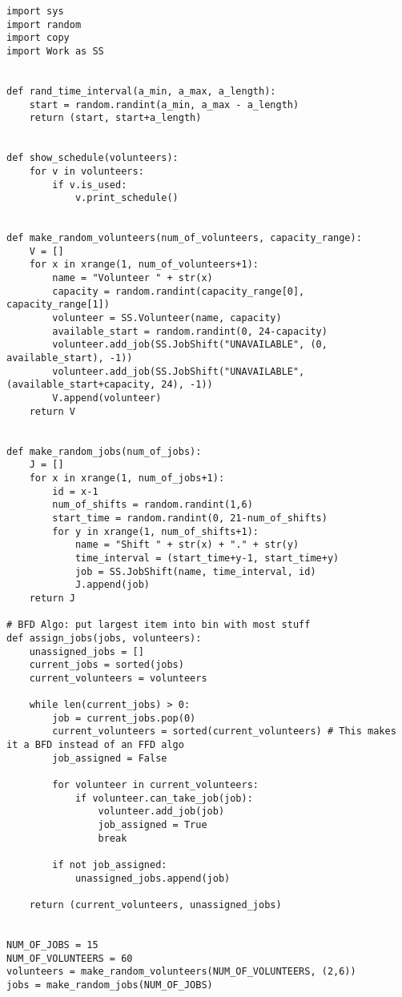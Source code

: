 \documentclass[12pt]{article}
\theoremstyle{definition}
\begin{document}
\begin{lstlisting}
import sys
import random
import copy
import Work as SS


def rand_time_interval(a_min, a_max, a_length):
    start = random.randint(a_min, a_max - a_length)
    return (start, start+a_length)


def show_schedule(volunteers):
    for v in volunteers:
        if v.is_used:
            v.print_schedule()


def make_random_volunteers(num_of_volunteers, capacity_range):
    V = []
    for x in xrange(1, num_of_volunteers+1):
        name = "Volunteer " + str(x)
        capacity = random.randint(capacity_range[0], capacity_range[1])
        volunteer = SS.Volunteer(name, capacity)
        available_start = random.randint(0, 24-capacity)
        volunteer.add_job(SS.JobShift("UNAVAILABLE", (0, available_start), -1))
        volunteer.add_job(SS.JobShift("UNAVAILABLE", (available_start+capacity, 24), -1))
        V.append(volunteer)
    return V


def make_random_jobs(num_of_jobs):
    J = []
    for x in xrange(1, num_of_jobs+1):
        id = x-1
        num_of_shifts = random.randint(1,6)
        start_time = random.randint(0, 21-num_of_shifts)
        for y in xrange(1, num_of_shifts+1):
            name = "Shift " + str(x) + "." + str(y)
            time_interval = (start_time+y-1, start_time+y)
            job = SS.JobShift(name, time_interval, id)
            J.append(job)
    return J

# BFD Algo: put largest item into bin with most stuff
def assign_jobs(jobs, volunteers):
    unassigned_jobs = []
    current_jobs = sorted(jobs)
    current_volunteers = volunteers

    while len(current_jobs) > 0:
        job = current_jobs.pop(0)
        current_volunteers = sorted(current_volunteers) # This makes it a BFD instead of an FFD algo
        job_assigned = False

        for volunteer in current_volunteers:
            if volunteer.can_take_job(job):
                volunteer.add_job(job)
                job_assigned = True
                break

        if not job_assigned:
            unassigned_jobs.append(job)

    return (current_volunteers, unassigned_jobs)


NUM_OF_JOBS = 15
NUM_OF_VOLUNTEERS = 60
volunteers = make_random_volunteers(NUM_OF_VOLUNTEERS, (2,6))
jobs = make_random_jobs(NUM_OF_JOBS)


\end{lstlisting}
\end{document}
